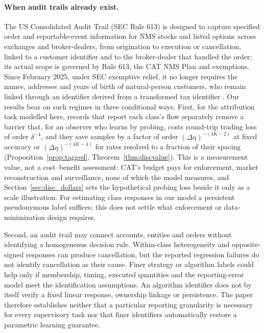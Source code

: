 \paragraph{When audit trails already exist.} The US Consolidated Audit Trail (SEC Rule 613) is designed to capture specified order and reportable-event information for NMS stocks and listed options across exchanges and broker-dealers, from origination to execution or cancellation, linked to a customer identifier and to the broker-dealer that handled the order; its actual scope is governed by Rule 613, the CAT NMS Plan and exemptions. Since February 2025, under SEC exemptive relief, it no longer requires the names, addresses and years of birth of natural-person customers, who remain linked through an identifier derived from a transformed tax identifier \citep{sec2012,sec2016,sec2024cat,sec2025}. Our results bear on such regimes in three conditional ways. First, for the attribution task modelled here, records that report each class's flow separately remove a barrier that, for an observer who learns by probing, costs round-trip trading loss of order $\delta^{-4}$, and they save samples by a factor of order $(\Delta\eta)^{-(4K-2)}$ at fixed accuracy or $(\Delta\eta)^{-(4K-4)}$ for rates resolved to a fraction of their spacing (Proposition~\ref{prop:tagged}, Theorem~\ref{thm:discvalue}). This is a measurement value, not a cost--benefit assessment: CAT's budget pays for enforcement, market reconstruction and surveillance, none of which the model measures, and Section~\ref{sec:disc_dollars} sets the hypothetical probing loss beside it only as a scale illustration. For estimating class responses in our model a persistent pseudonymous label suffices; this does not settle what enforcement or data-minimization design requires. 

Second, an audit trail may connect accounts, entities and orders without identifying a homogeneous decision rule. Within-class heterogeneity and opposite-signed responses can produce cancellation, but the reported regression failures do not identify cancellation as their cause. Finer strategy or algorithm labels could help only if membership, timing, executed quantities and the reporting-error model meet the identification assumptions. An algorithm identifier does not by itself verify a fixed linear response, ownership linkage or persistence. The paper therefore establishes neither that a particular reporting granularity is necessary for every supervisory task nor that finer identifiers automatically restore a parametric learning guarantee.

